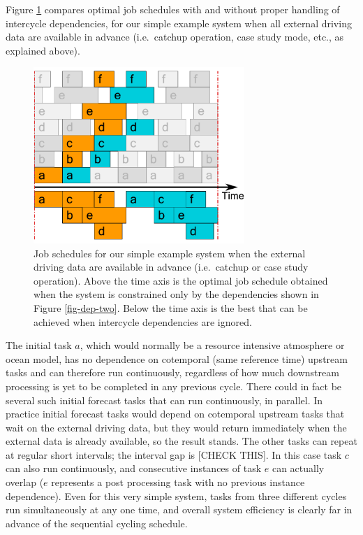 \documentclass[11pt,a4paper]{article}
\begin{document}
Figure \ref{fig-time-two} compares optimal job schedules with 
and without proper handling of intercycle dependencies, for our simple
example system when all external driving data are available in advance
(i.e.\ catchup operation, case study mode, etc., as explained above).
\begin{figure} 
    \begin{center} 
        \includegraphics[width=8cm]{timeline-two}
    \end{center} 
    \caption{\small Job schedules for our simple example system when the
    external driving data are available in advance (i.e.\ catchup or case
    study operation). Above the time axis is the optimal job schedule
    obtained when the system is constrained only by the dependencies
    shown in Figure \ref{fig-dep-two}. Below the time axis is the best
    that can be achieved when intercycle dependencies are ignored.} 
    \label{fig-time-two}
\end{figure} 
The initial task $a$, which would normally be a resource intensive
atmosphere or ocean model, has no dependence on cotemporal (same
reference time) upstream tasks and can therefore run continuously,
regardless of how much downstream processing is yet to be
completed in any previous cycle. There could in fact be several such
initial forecast tasks that can run continuously, in parallel. In
practice initial forecast tasks would depend on cotemporal upstream
tasks that wait on the external driving data, but they would return 
immediately when the external data is already available, so the result
stands. The other tasks can repeat at regular short intervals; the
interval gap is [CHECK THIS].
In this case task $c$ can also run continuously, and consecutive
instances of task $e$ can actually overlap ($e$ represents a post
processing task with no previous instance dependence). Even for this
very simple system, tasks from three different cycles run simultaneously
at any one time, and overall system efficiency is clearly far in advance
of the sequential cycling schedule.  
\end{document}
